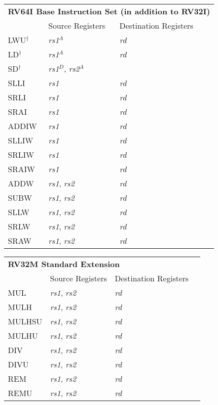 \begin{tabular}{p{25mm}|p{3cm}|p{6cm}|p{10cm}}
  \multicolumn{4}{l}{\bf RV64I Base Instruction Set (in addition to RV32I)} \\
  \cline{2-3}
   & Source Registers & Destination Registers \\
  \cline{2-3}
   LWU$^\dagger$ & {\em rs1}$^A$ & {\em rd} &  \\
   \cline{2-3}
   LD$^\dagger$ & {\em rs1}$^A$ & {\em rd} &  \\
   \cline{2-3}
   SD$^\dagger$ & {\em rs1}$^D$, {\em rs2}$^A$ &  &  \\
   \cline{2-3}
   SLLI & {\em rs1} & {\em rd} &  \\
   \cline{2-3}
   SRLI & {\em rs1} & {\em rd} &  \\
   \cline{2-3}
   SRAI & {\em rs1} & {\em rd} &  \\
   \cline{2-3}
   ADDIW & {\em rs1} & {\em rd} &  \\
   \cline{2-3}
   SLLIW & {\em rs1} & {\em rd} &  \\
   \cline{2-3}
   SRLIW & {\em rs1} & {\em rd} &  \\
   \cline{2-3}
   SRAIW & {\em rs1} & {\em rd} &  \\
   \cline{2-3}
   ADDW & {\em rs1}, {\em rs2} & {\em rd} &  \\
   \cline{2-3}
   SUBW & {\em rs1}, {\em rs2} & {\em rd} &  \\
   \cline{2-3}
   SLLW & {\em rs1}, {\em rs2} & {\em rd} &  \\
   \cline{2-3}
   SRLW & {\em rs1}, {\em rs2} & {\em rd} &  \\
   \cline{2-3}
   SRAW & {\em rs1}, {\em rs2} & {\em rd} &  \\
   \cline{2-3}
\end{tabular}

\begin{tabular}{p{25mm}|p{3cm}|p{6cm}|p{10cm}}
  \multicolumn{4}{l}{\bf RV32M Standard Extension} \\
  \cline{2-3}
   & Source Registers & Destination Registers \\
  \cline{2-3}
   MUL & {\em rs1}, {\em rs2} & {\em rd} &  \\
   \cline{2-3}
   MULH & {\em rs1}, {\em rs2} & {\em rd} &  \\
   \cline{2-3}
   MULHSU & {\em rs1}, {\em rs2} & {\em rd} &  \\
   \cline{2-3}
   MULHU & {\em rs1}, {\em rs2} & {\em rd} &  \\
   \cline{2-3}
   DIV & {\em rs1}, {\em rs2} & {\em rd} &  \\
   \cline{2-3}
   DIVU & {\em rs1}, {\em rs2} & {\em rd} &  \\
   \cline{2-3}
   REM & {\em rs1}, {\em rs2} & {\em rd} &  \\
   \cline{2-3}
   REMU & {\em rs1}, {\em rs2} & {\em rd} &  \\
   \cline{2-3}
\end{tabular}


